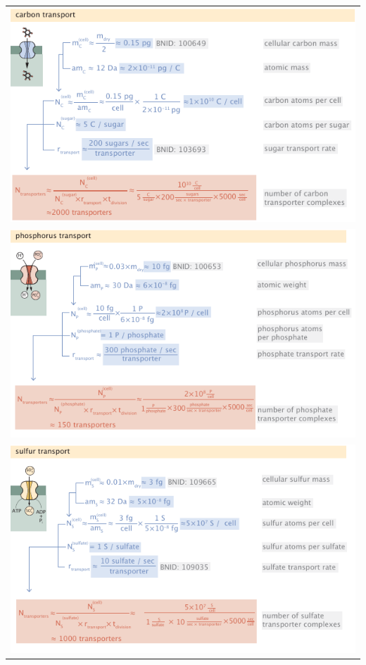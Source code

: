 \begin{longtable}{c}
\includegraphics{SI_estimates/C_transport.pdf}  \\
\includegraphics{SI_estimates/P_transport.pdf}  \\
\includegraphics{SI_estimates/S_transport.pdf}  \\

\end{longtable}
